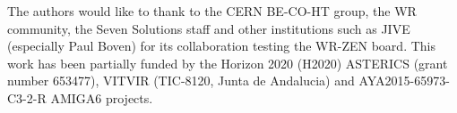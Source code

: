 The authors would like to thank to the CERN BE-CO-HT group, the WR community, the Seven Solutions staff and
other institutions such as JIVE (especially Paul Boven) for its collaboration testing the
WR-ZEN board. This work has been partially funded by the Horizon 2020 (H2020) ASTERICS (grant number 653477),
VITVIR (TIC-8120, Junta de Andalucia) and AYA2015-65973-C3-2-R AMIGA6 projects.